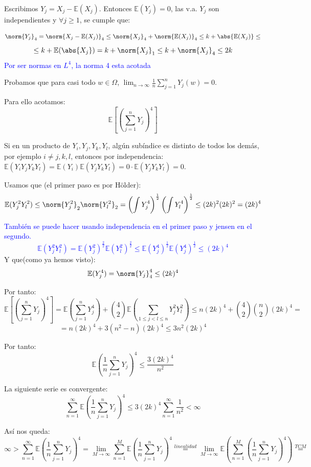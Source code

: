 \documentclass{apuntes}
\begin{document}
Escribimos $Y_j=X_j-\mathbb{E}(X_j)$. Entonces $\mathbb{E}(Y_j)=0$, las v.a. $Y_j$ son independientes y $\forall j \geq 1$, se cumple que:

\[
\norm{Y_j}_4 = \norm{X_j - \mathbb{E}(X_j)}_4 \leq \norm{X_j}_4 + \norm{\mathbb{E}(X_j)}_4 \leq k + \abs{\mathbb{E}(X_j)} \leq
\]
\[
\leq k + \mathbb{E}(\abs{X_j}) = k + \norm{X_j}_1 \leq k + \norm{X_j}_4 \leq 2k
\]
\textcolor{blue}{Por ser normas en $L^4$, la norma 4 esta acotada}

Probamos que para casi todo $w \in \Omega$, $\lim_{n \rightarrow \infty} \frac{1}{n} \sum_{j=1}^{n}Y_j(w)=0$.

Para ello acotamos:
\[
\mathbb{E}\left[ (\sum_{j=1}^{n} Y_j)^4 \right]
\]

Si en un producto de $Y_i, Y_j, Y_k, Y_l$, algún subíndice es distinto de todos los demás, por ejemplo $i\neq j,k,l$, entonces por independencia: $\mathbb{E}(Y_i Y_j Y_k Y_l)=\mathbb{E}(Y_i)\mathbb{E}(Y_j Y_k Y_l) = 0 \cdot \mathbb{E}(Y_j Y_k Y_l) = 0$.

Usamos que (el primer paso es por Hölder):
\[
\mathbb{E}(Y_j^2 Y_l^2) \leq \norm{Y_j^2}_2 \norm{Y_l^2}_2 = \left( \int Y_j^4\right)^{\frac{1}{2}} \left( \int Y_l^4\right)^{\frac{1}{2}} \leq (2k)^2(2k)^2=(2k)^4
\]

\textcolor{blue}{También se puede hacer usando independencia en el primer paso y jensen en el segundo.
\[
\mathbb{E}(Y_j^2 Y_l^2) = \mathbb{E}(Y_j^2)^\frac{2}{2} \mathbb{E}(Y_l^2)^\frac{2}{2} \leq \mathbb{E}(Y_j^4)^\frac{1}{2}\mathbb{E}(Y_j^4)^\frac{1}{2}\leq(2k)^4
\]
}
Y que(como ya hemos visto):
\[
\mathbb{E}(Y_j^4) = \norm{Y_j}_4^4\leq(2k)^4
\]

Por tanto:
\[
\mathbb{E}\left[(\sum_{j=1}^{n} Y_j)^4\right]= \mathbb{E}(\sum_{j=1}^{n} Y_j^4) + \binom{4}{2}\mathbb{E}(\sum_{1\leq j<l\leq n} Y_j^2 Y_l^2)\leq n(2k)^4 + \binom{4}{2}\binom{n}{2}(2k)^4 =
\]
\[
= n(2k)^4+3(n^2-n)(2k)^4 \leq 3n^2(2k)^4
\]

Por tanto:
\[
\mathbb{E}(\frac{1}{n}\sum_{j=1}^{n}Y_j)^4 \leq \frac{3(2k)^4}{n^2}
\]

La siguiente serie es convergente:
\[
\sum_{n=1}^{\infty}\mathbb{E}(\frac{1}{n}\sum_{j=1}^{n}Y_j)^4 \leq 3(2k)^4 \sum_{n=1}^{\infty}\frac{1}{n^2} < \infty
\]

Así nos queda:
\[
\infty > \sum_{n=1}^{\infty}\mathbb{E}(\frac{1}{n}\sum_{j=1}^{n}Y_j)^4 = \lim_{M \rightarrow \infty}\sum_{n=1}^{M}\mathbb{E}(\frac{1}{n}\sum_{j=1}^{n}Y_j)^4 \stackrel{linealidad}{=} \lim_{M \rightarrow \infty} \mathbb{E}\left(\sum_{n=1}^{M}(\frac{1}{n}\sum_{j=1}^{n}Y_j)^4 \right) \stackrel{TCM}{=}
\]
\end{document}
